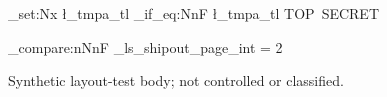\documentclass{linearspace-report}
\begin{document}
\ExplSyntaxOn
\tl_set:Nx \l_tmpa_tl {\LSBannerText}
\tl_if_eq:NnF \l_tmpa_tl {TOP~SECRET}
  {\PackageError{linearspace-test}{Multi-owner~mode~replaced~the~classified~document~banner}{}}
\ExplSyntaxOff
\LSMakeReportTitle
\ExplSyntaxOn
\int_compare:nNnF {\g_ls_shipout_page_int} = {2}
  {\PackageError{linearspace-test}{Full-combination~report~cover~and~required~release-notice~page~count~regression}{}}
\ExplSyntaxOff
{}
Synthetic layout-test body; not controlled or classified.
\end{document}
